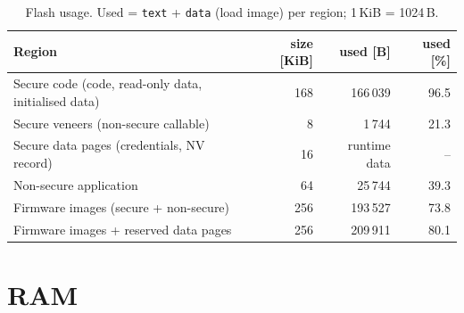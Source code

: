 \documentclass[11pt,a4paper]{report}
\begin{document}
\begin{table}[htbp]
\centering\small
\begin{tabular}{lrrr}
\toprule
Region & size [KiB] & used [B] & used [\%] \\
\midrule
Secure code (code, read-only data, initialised data) & 168 & 166\,039 & 96.5 \\
Secure veneers (non-secure callable) & 8 & 1\,744 & 21.3 \\
Secure data pages (credentials, NV record) & 16 & runtime data & -- \\
Non-secure application & 64 & 25\,744 & 39.3 \\
\midrule
Firmware images (secure + non-secure) & 256 & 193\,527 & 73.8 \\
Firmware images + reserved data pages & 256 & 209\,911 & 80.1 \\
\bottomrule
\end{tabular}
\caption{Flash usage. Used = \texttt{text} + \texttt{data} (load image) per region; 1\,KiB = 1024\,B.}
\label{tab:flash}
\end{table}

\section{RAM}

\begin{table}[htbp]
\centering\small
{}
\caption{Static RAM usage. Reserved heap/stack per linker script: secure 0.5\,KiB heap + 16\,KiB stack, non-secure 0.5\,KiB heap + 1\,KiB stack.}
\label{tab:ram}
\end{table}
\end{document}
